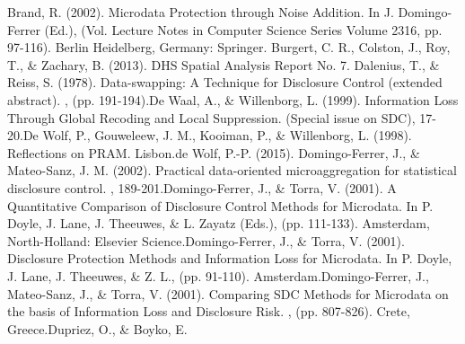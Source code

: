 \documentclass[letterpaper,10pt,english]{sphinxmanual}
\begin{document}
{\hyperref[\detokenize{20http:/www.ihsn.org/home/software/disclosure-control-toolbox::doc}]{}}


Brand, R. (2002). Microdata Protection through Noise Addition. In J.
Domingo-Ferrer (Ed.),  (Vol. Lecture Notes in Computer Science Series
Volume 2316, pp. 97-116). Berlin Heidelberg, Germany: Springer.
Burgert, C. R., Colston, J., Roy, T., \& Zachary, B. (2013).  DHS Spatial Analysis Report No.
7.
Dalenius, T., \& Reiss, S. (1978). Data-swapping: A Technique for
Disclosure Control (extended abstract). , (pp.
191-194).De Waal, A., \& Willenborg, L. (1999). Information Loss Through
Global Recoding and Local Suppression. 
 (Special issue on SDC), 17-20.De Wolf, P., Gouweleew, J. M.,
Kooiman, P., \& Willenborg, L. (1998). Reflections on PRAM.  Lisbon.de Wolf, P.-P.
(2015).  Domingo-Ferrer,
J., \& Mateo-Sanz, J. M. (2002). Practical data-oriented microaggregation
for statistical disclosure control.  , 189-201.Domingo-Ferrer, J., \& Torra, V.
(2001). A Quantitative Comparison of Disclosure Control Methods for
Microdata. In P. Doyle, J. Lane, J. Theeuwes, \& L. Zayatz (Eds.),
 (pp. 111-133). Amsterdam,
North-Holland: Elsevier Science.Domingo-Ferrer, J., \& Torra, V. (2001).
Disclosure Protection Methods and Information Loss for Microdata. In P.
Doyle, J. Lane, J. Theeuwes, \& Z. L.,  (pp. 91-110). Amsterdam.Domingo-Ferrer, J.,
Mateo-Sanz, J., \& Torra, V. (2001). Comparing SDC Methods for Microdata
on the basis of Information Loss and Disclosure Risk. , (pp. 807-826). Crete, Greece.Dupriez, O., \& Boyko, E.
\end{document}
